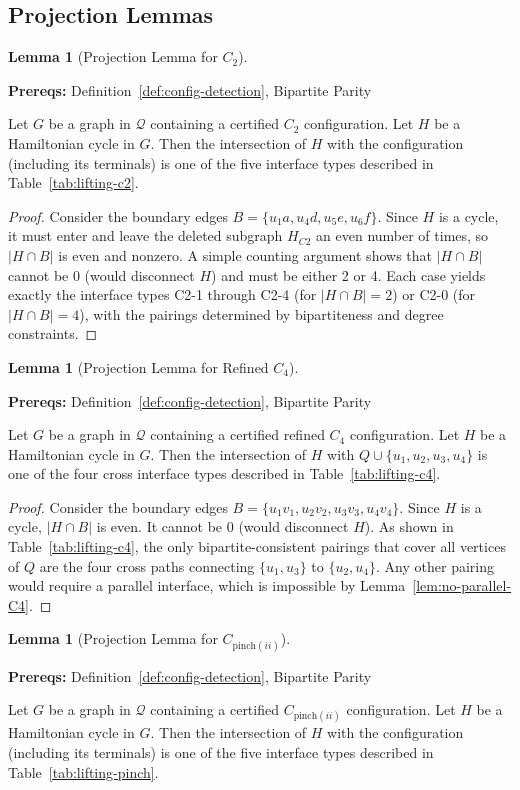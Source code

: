 \documentclass[12pt]{article}
\theoremstyle{definition}
\newtheorem{lemma}[theorem]{Lemma}
\newcommand{\prereq}[1]{\par\noindent\textbf{Prereqs:} #1\par}
\begin{document}
\subsection{Projection Lemmas}
\label{subsec:projection-lemmas}

\begin{lemma}[Projection Lemma for $C_2$]
\label{lemma:projection-c2}
\prereq{Definition~\ref{def:config-detection}, Bipartite Parity}
Let $G$ be a graph in $\mathcal{Q}$ containing a certified $C_2$ configuration. Let $H$ be a Hamiltonian cycle in $G$. Then the intersection of $H$ with the configuration (including its terminals) is one of the five interface types described in Table~\ref{tab:lifting-c2}.
\end{lemma}

\begin{proof}
Consider the boundary edges $B = \{u_1a, u_4d, u_5e, u_6f\}$. Since $H$ is a cycle, it must enter and leave the deleted subgraph $H_{C2}$ an even number of times, so $|H \cap B|$ is even and nonzero. A simple counting argument shows that $|H \cap B|$ cannot be 0 (would disconnect $H$) and must be either 2 or 4. Each case yields exactly the interface types C2-1 through C2-4 (for $|H \cap B|=2$) or C2-0 (for $|H \cap B|=4$), with the pairings determined by bipartiteness and degree constraints.
\end{proof}

\begin{lemma}[Projection Lemma for Refined $C_4$]
\label{lem:proj-C4}
\prereq{Definition~\ref{def:config-detection}, Bipartite Parity}
Let $G$ be a graph in $\mathcal{Q}$ containing a certified refined $C_4$ configuration. Let $H$ be a Hamiltonian cycle in $G$. Then the intersection of $H$ with $Q \cup \{u_1, u_2, u_3, u_4\}$ is one of the four cross interface types described in Table~\ref{tab:lifting-c4}.
\end{lemma}

\begin{proof}
Consider the boundary edges $B = \{u_1v_1, u_2v_2, u_3v_3, u_4v_4\}$. Since $H$ is a cycle, $|H \cap B|$ is even. It cannot be 0 (would disconnect $H$). As shown in Table~\ref{tab:lifting-c4}, the only bipartite-consistent pairings that cover all vertices of $Q$ are the four cross paths connecting $\{u_1,u_3\}$ to $\{u_2,u_4\}$. Any other pairing would require a parallel interface, which is impossible by Lemma~\ref{lem:no-parallel-C4}.
\end{proof}

\begin{lemma}[Projection Lemma for $C_{\text{pinch}(ii)}$]
\label{lemma:projection-pinch}
\prereq{Definition~\ref{def:config-detection}, Bipartite Parity}
Let $G$ be a graph in $\mathcal{Q}$ containing a certified $C_{\text{pinch}(ii)}$ configuration. Let $H$ be a Hamiltonian cycle in $G$. Then the intersection of $H$ with the configuration (including its terminals) is one of the five interface types described in Table~\ref{tab:lifting-pinch}.
\end{lemma}
\end{document}
